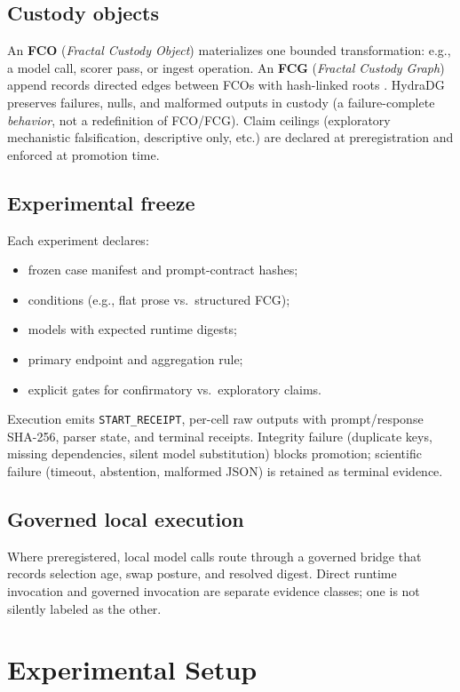 \documentclass{article}
\begin{document}
\subsection{Custody objects}

An \textbf{FCO} (\emph{Fractal Custody Object}) materializes one bounded transformation: e.g., a model call, scorer pass, or ingest operation.
An \textbf{FCG} (\emph{Fractal Custody Graph}) append records directed edges between FCOs with hash-linked roots \cite{laurie2013ct}.
HydraDG preserves failures, nulls, and malformed outputs in custody (a failure-complete \emph{behavior}, not a redefinition of FCO/FCG).
Claim ceilings (exploratory mechanistic falsification, descriptive only, etc.) are declared at preregistration and enforced at promotion time.

\subsection{Experimental freeze}

Each experiment declares:
\begin{itemize}
  \item frozen case manifest and prompt-contract hashes;
  \item conditions (e.g., flat prose vs.\ structured FCG);
  \item models with expected runtime digests;
  \item primary endpoint and aggregation rule;
  \item explicit gates for confirmatory vs.\ exploratory claims.
\end{itemize}
Execution emits \texttt{START\_RECEIPT}, per-cell raw outputs with prompt/response SHA-256, parser state, and terminal receipts.
Integrity failure (duplicate keys, missing dependencies, silent model substitution) blocks promotion; scientific failure (timeout, abstention, malformed JSON) is retained as terminal evidence.

\subsection{Governed local execution}

Where preregistered, local model calls route through a governed bridge that records selection age, swap posture, and resolved digest.
Direct runtime invocation and governed invocation are separate evidence classes; one is not silently labeled as the other.

\section{Experimental Setup}
\end{document}

